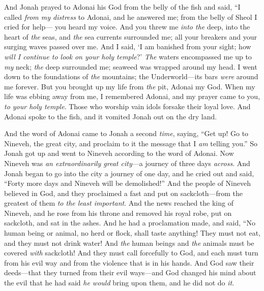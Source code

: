 \begin{biblechapter} %
\verse And Jonah prayed to Adonai his God from the belly of the fish
\verse and said,
\verse “I called \textit{from my distress} to Adonai, 
and he answered me; 
from the belly of Sheol I cried for help— 
you heard my voice.
\verse And you threw me \textit{into the} deep, 
into the heart of \textit{the} seas, 
and \textit{the} sea currents surrounded me; 
all your breakers and your surging waves 
passed over me.
\verse And I said, ‘I am banished 
from your sight; 
how \textit{will I continue to look} 
\textit{on your holy temple}?’
\verse \textit{The} waters encompassed me up to \textit{my} neck; 
\textit{the} deep surrounded me; 
seaweed was wrapped around my head.
\verse I went down to the foundations of \textit{the} mountains; 
the Underworld—its bars \textit{were} around me forever. 
But you brought up my life from \textit{the} pit, 
Adonai my God.
\verse When my life was ebbing away from me, 
I remembered Adonai, 
and my prayer came to you, 
\textit{to your holy temple}.
\verse Those who worship vain idols 
forsake their loyal love.
\verse And Adonai spoke to the fish, and it vomited Jonah out on the dry land.
\end{biblechapter}

\begin{biblechapter} %
 And the word of Adonai came to Jonah a second \textit{time}, saying,
\verse “Get up! Go to Nineveh, the great city, and proclaim to it the message that I \textit{am} telling you.”
\verse So Jonah got up and went to Nineveh according to the word of Adonai. Now Nineveh was \textit{an extraordinarily great city}—a journey of three days \textit{across}.
\verse And Jonah began to go into the city a journey of one day, and he cried out and said, “Forty more days and Nineveh will be demolished!”
\verse And the people of Nineveh believed in God, and they proclaimed a fast and put on sackcloth—from the greatest of them \textit{to the least important}.
 And the news reached the king of Nineveh, and he rose from his throne and removed his royal robe, put on sackcloth, and sat in the ashes.
\verse And he had a proclamation made, and said,
\verse “No human being or animal, no herd or flock, shall taste anything! They must not eat, and they must not drink water!
\verse And \textit{the} human beings and \textit{the} animals must be covered \textit{with} sackcloth! And they must call forcefully to God, and each must turn from his evil way and from the violence that is in his hands.
\verse And God saw their deeds—that they turned from their evil ways—and God changed his mind about the evil that he had said \textit{he would} bring upon them, and he did not do \textit{it}.
\end{biblechapter}

